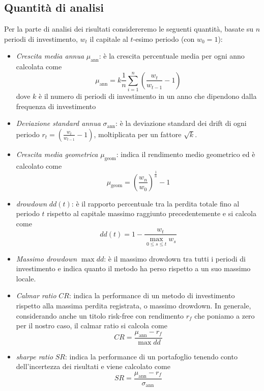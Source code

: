\documentclass[a4paper,11pt]{book}
\theoremstyle{plain}
\theoremstyle{definition}
\theoremstyle{remark}
\begin{document}
\subsection{Quantità di analisi}
Per la parte di analisi dei risultati considereremo le seguenti quantità, basate su $n$ periodi di investimento, $w_t$ il capitale al $t$-esimo periodo (con $w_0=1$):
\begin{itemize}
	\item \textit{Crescita media annua} $\mu_{\text{ann}}$: è la crescita percentuale media per ogni anno calcolata come
	\begin{equation*}
		\mu_{\text{ann}}=k\frac{1}{n}\sum_{i=1}^{n}{\left(\frac{w_t}{w_{t-1}}-1\right)}
	\end{equation*}
	dove $k$ è il numero di periodi di investimento in un anno che dipendono dalla frequenza di investimento
	\item \textit{Deviazione standard annua} $\sigma_{\text{ann}}$: è la deviazione standard dei drift di ogni periodo $r_t=\left(\frac{w_t}{w_{t-1}}-1\right)$, moltiplicata per un fattore $\sqrt{k}$.
	\item \textit{Crescita media geometrica} $\mu_{\text{geom}}$: indica il rendimento medio geometrico ed è calcolato come
	\begin{equation*}
		\mu_{\text{geom}}=\left(\frac{w_n}{w_0}\right)^{\frac{1}{n}}-1
	\end{equation*}
	\item \textit{drowdown} $dd(t)$: è il rapporto percentuale tra la perdita totale fino al periodo $t$ rispetto al capitale massimo raggiunto precedentemente e si calcola come
	\begin{equation*}
		dd(t) = 1-\frac{w_t}{\max\limits_{0\leq s\leq t}w_s}
	\end{equation*}
	\item \textit{Massimo drowdown} $\max dd$: è il massimo drowdown tra tutti i periodi di investimento e indica quanto il metodo ha perso rispetto a un suo massimo locale.
	\item \textit{Calmar ratio} $CR$: indica la performance di un metodo di investimento rispetto alla massima perdita registrata, o massimo drowdown. In generale, considerando anche un titolo risk-free con rendimento $r_f$ che poniamo a zero per il nostro caso, il calmar ratio si calcola come
	\begin{equation*}
		CR = \frac{\mu_{\text{ann}}-r_f}{\max dd}
	\end{equation*}
	
	\item \textit{sharpe ratio} $SR$: indica la performance di un portafoglio tenendo conto dell'incertezza dei risultati e viene calcolato come
	\begin{equation*}
		SR = \frac{\mu_{\text{ann}}-r_f}{\sigma_{\text{ann}}}
	\end{equation*}
\end{itemize}
\end{document}
